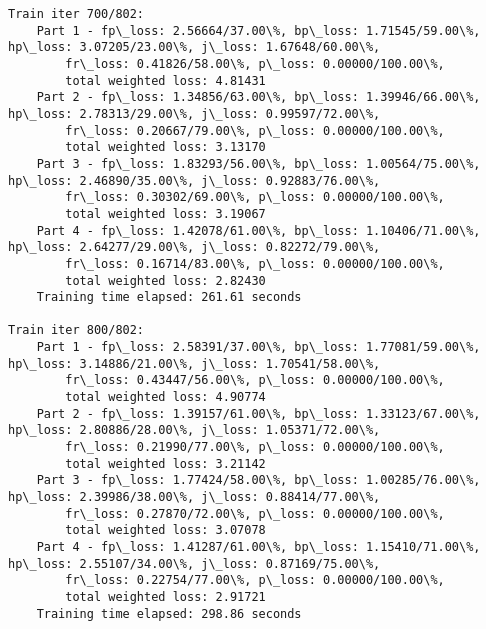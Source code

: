 \documentclass[11pt]{article}
\begin{document}
\begin{Verbatim}[commandchars=\\\{\}]
Train iter 700/802:
	Part 1 - fp\_loss: 2.56664/37.00\%, bp\_loss: 1.71545/59.00\%, hp\_loss: 3.07205/23.00\%, j\_loss: 1.67648/60.00\%, 
		fr\_loss: 0.41826/58.00\%, p\_loss: 0.00000/100.00\%, 
		total weighted loss: 4.81431
	Part 2 - fp\_loss: 1.34856/63.00\%, bp\_loss: 1.39946/66.00\%, hp\_loss: 2.78313/29.00\%, j\_loss: 0.99597/72.00\%, 
		fr\_loss: 0.20667/79.00\%, p\_loss: 0.00000/100.00\%, 
		total weighted loss: 3.13170
	Part 3 - fp\_loss: 1.83293/56.00\%, bp\_loss: 1.00564/75.00\%, hp\_loss: 2.46890/35.00\%, j\_loss: 0.92883/76.00\%, 
		fr\_loss: 0.30302/69.00\%, p\_loss: 0.00000/100.00\%, 
		total weighted loss: 3.19067
	Part 4 - fp\_loss: 1.42078/61.00\%, bp\_loss: 1.10406/71.00\%, hp\_loss: 2.64277/29.00\%, j\_loss: 0.82272/79.00\%, 
		fr\_loss: 0.16714/83.00\%, p\_loss: 0.00000/100.00\%, 
		total weighted loss: 2.82430
	Training time elapsed: 261.61 seconds

Train iter 800/802:
	Part 1 - fp\_loss: 2.58391/37.00\%, bp\_loss: 1.77081/59.00\%, hp\_loss: 3.14886/21.00\%, j\_loss: 1.70541/58.00\%, 
		fr\_loss: 0.43447/56.00\%, p\_loss: 0.00000/100.00\%, 
		total weighted loss: 4.90774
	Part 2 - fp\_loss: 1.39157/61.00\%, bp\_loss: 1.33123/67.00\%, hp\_loss: 2.80886/28.00\%, j\_loss: 1.05371/72.00\%, 
		fr\_loss: 0.21990/77.00\%, p\_loss: 0.00000/100.00\%, 
		total weighted loss: 3.21142
	Part 3 - fp\_loss: 1.77424/58.00\%, bp\_loss: 1.00285/76.00\%, hp\_loss: 2.39986/38.00\%, j\_loss: 0.88414/77.00\%, 
		fr\_loss: 0.27870/72.00\%, p\_loss: 0.00000/100.00\%, 
		total weighted loss: 3.07078
	Part 4 - fp\_loss: 1.41287/61.00\%, bp\_loss: 1.15410/71.00\%, hp\_loss: 2.55107/34.00\%, j\_loss: 0.87169/75.00\%, 
		fr\_loss: 0.22754/77.00\%, p\_loss: 0.00000/100.00\%, 
		total weighted loss: 2.91721
	Training time elapsed: 298.86 seconds


\end{Verbatim}
\end{document}

